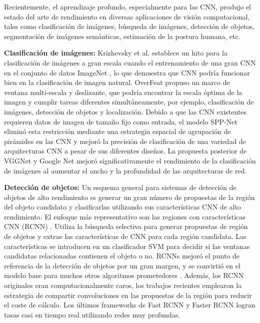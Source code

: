 Recientemente, el aprendizaje profundo, especialmente para las CNN, produjo el estado del arte de rendimiento en diversas aplicaciones de visión computacional, tales como clasificación de imágenes, búsqueda de imágenes, detección de objetos, segmentación de imágenes semánticas, estimación de la postura humana, etc.

\textbf{Clasificación de imágenes:} Krizhevsky et al. \cite{Krizhevsky} establece un hito para la clasificación de imágenes a gran escala cuando el entrenamiento de una gran CNN en el conjunto de datos ImageNet \cite{Deng}, lo que demuestra que CNN podría funcionar bien en la clasificación de imagen natural. OverFeat \cite{Sermanet} propuso un marco de ventana multi-escala y deslizante, que podría encontrar la escala óptima de la imagen y cumplir tareas diferentes simultáneamente, por ejemplo, clasificación de imágenes, detección de objetos y localización. Debido a que las CNN existentes requieren datos de imagen de tamaño fijo como entrada, el modelo SPP-Net eliminó esta restricción mediante una estrategia espacial de agrupación de pirámides en las CNN y mejoró la precisión de clasificación de una variedad de arquitecturas CNN a pesar de sus diferentes diseños.  La propuesta posterior de VGGNet \cite{Simonyan} y Google Net \cite{Szegedy} mejoró significativamente el rendimiento de la clasificación de imágenes al aumentar el ancho y la profundidad de las arquitecturas de red.

\textbf{Detección de objetos: }Un esquema general para sistemas de detección de objetos de alto rendimiento es generar un gran número de propuestas de la región del objeto candidato y clasificarlas utilizando sus características CNN de alto rendimiento. El enfoque más representativo son las regiones con características CNN (RCNN) \cite{Girshick}. Utiliza la búsqueda selectiva \cite{Uijlings} para generar propuestas de región de objetos y extrae las características de CNN para cada región candidata. Las características se introducen en un clasificador SVM para decidir si las ventanas candidatas relacionadas contienen el objeto o no. RCNNs mejoró el punto de referencia de la detección de objetos por un gran margen, y se convirtió en el modelo base para muchos otros algoritmos prometedores \cite{Hariharan,Zhu,Zhang}. Además, los RCNN originales eran computacionalmente caros, los trabajos recientes \cite{He,GirshickR} emplearon la estrategia de compartir convoluciones en las propuestas de la región para reducir el coste de cálculo. Los últimos frameworks de Fast RCNN \cite{GirshickR} y Faster RCNN \cite{Ren} logran tasas casi en tiempo real utilizando redes muy profundas.

